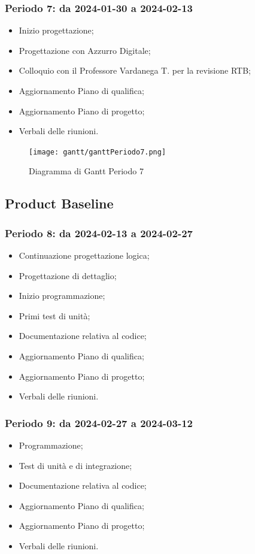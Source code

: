 \documentclass[10pt, a4paper]{article}
\begin{document}
\subsubsection{Periodo 7: da 2024-01-30 a 2024-02-13}
%
\begin{itemize}
    \item Inizio progettazione;
    \item Progettazione con Azzurro Digitale;
    \item Colloquio con il Professore Vardanega T. per la revisione RTB;
    \item Aggiornamento Piano di qualifica;
    \item Aggiornamento Piano di progetto;
    \item Verbali delle riunioni.
\end{itemize}
\begin{figure}[H]
    \centering        
    \texttt{[image: gantt/ganttPeriodo7.png]}
    \caption{Diagramma di Gantt Periodo 7}
\end{figure}

\subsection{Product Baseline}

\subsubsection{Periodo 8: da 2024-02-13 a 2024-02-27}
%
\begin{itemize}
    \item Continuazione progettazione logica;
    \item Progettazione di dettaglio;
    \item Inizio programmazione;
    \item Primi test di unità;
    \item Documentazione relativa al codice;
    \item Aggiornamento Piano di qualifica;
    \item Aggiornamento Piano di progetto;
    \item Verbali delle riunioni.
\end{itemize}

\subsubsection{Periodo 9: da 2024-02-27 a 2024-03-12}
%
\begin{itemize}
    \item Programmazione;
    \item Test di unità e di integrazione;
    \item Documentazione relativa al codice;
    \item Aggiornamento Piano di qualifica;
    \item Aggiornamento Piano di progetto;
    \item Verbali delle riunioni.
\end{itemize}
\end{document}
